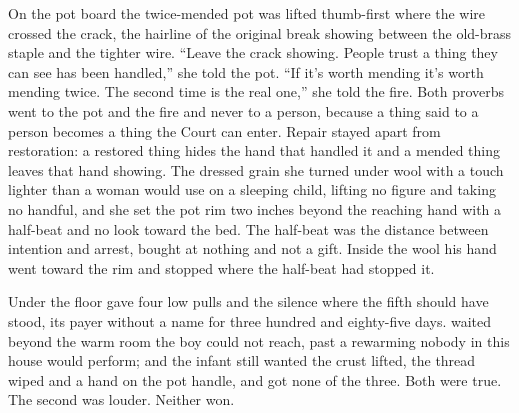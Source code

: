 On the pot board the twice-mended pot was lifted thumb-first where the wire crossed the crack, the hairline of the original break showing between the old-brass staple and the tighter wire. “Leave the crack showing. People trust a thing they can see has been handled,” she told the pot. “If it's worth mending it's worth mending twice. The second time is the real one,” she told the fire. Both proverbs went to the pot and the fire and never to a person, because a thing said to a person becomes a thing the Court can enter. Repair stayed apart from restoration: a restored thing hides the hand that handled it and a mended thing leaves that hand showing. The dressed grain she turned under wool with a touch lighter than a woman would use on a sleeping child, lifting no figure and taking no handful, and she set the pot rim two inches beyond the reaching hand with a half-beat and no look toward the bed. The half-beat was the distance between intention and arrest, bought at nothing and not a gift. Inside the wool his hand went toward the rim and stopped where the half-beat had stopped it.

Under the floor  gave four low pulls and the silence where the fifth should have stood, its payer without a name for three hundred and eighty-five days.  waited beyond the warm room the boy could not reach, past a rewarming nobody in this house would perform; and the infant still wanted the crust lifted, the thread wiped and a hand on the pot handle, and got none of the three. Both were true. The second was louder. Neither won.

\scenebreak

